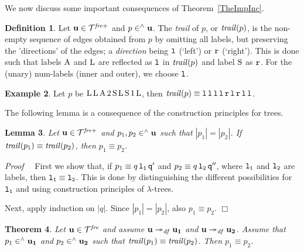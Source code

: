 \documentclass{article}
\theoremstyle{plain}
\newtheorem{The}{Theorem}[section]
\newtheorem{Lem}[The]{Lemma}
\theoremstyle{definition}
\newtheorem{Def}[The]{Definition}
\newtheorem{Exa}[The]{Example}
\begin{document}
{%



We now discuss some important consequences of Theorem~\ref{TheImpInc}.

\begin{Def}\label{DefTra}
Let ${\bf u} \in {\cal T}^{\it fre+}$ and $p \in^\wedge {\bf u}$. The {\em trail\/} of $p$, or ${\it trail\/}(p)$, is the non-empty sequence of edges obtained from $p$ by omitting all labels, but preserving the 'directions' of the edges; a {\em direction\/} being ${\tt l}$ (`left') or ${\tt r}$ (`right'). This is done such that labels ${\rm A}$ and ${\rm L}$  are reflected as ${\tt l}$ in ${\it trail\/}(p)$ and label ${\rm S}$ as ${\tt r}$. For the (unary) num-labels (inner and outer), we choose ${\tt l}$.
\end{Def}

\begin{Exa} Let $p$ be ${\rm L} \, {\rm L} \, {\rm A} \, 2 \, {\rm S} \, {\rm L} \, {\rm S} \, 1 \, {\rm L}$, then ${\it trail\/}(p) \equiv {\tt l} \, {\tt l} \, {\tt l} \, {\tt l} \, {\tt r} \, {\tt l} \, {\tt r} \, {\tt l} \, {\tt l}$.
\end{Exa}

The following lemma is a consequence of the construction principles for trees.

\begin{Lem}\label{LemTraIde}  Let ${\bf u} \in {\cal T}^{\it fre+}$ and $p_1, p_2 \in^\wedge {\bf u}$ such that $|p_1| = |p_2|$. If ${\it trail\/}(p_1) \equiv {\it trail\/}(p_2)$, then $p_1 \equiv p_2$.
\end{Lem}

{\em Proof}~~ First we show that, if $p_1 \equiv q \, \tt l_1 \, q'$ and $p_2 \equiv q \, \tt l_2 \, q''$, where $\tt l_1$ and $\tt l_2$ are labels, then $\tt l_1 \equiv \tt l_2$. This is done by distinguishing the different possibilities for $\tt l_1$ and using construction principles of $\lambda$-trees.

Next, apply induction on $|q|$. Since $|p_1| = |p_2|$, also $p_1 \equiv p_2$. $\Box$

\begin{The}\label{The}\label{TheTraTra}
Let ${\bf u} \in {\cal T}^{\it fre}$ and assume ${\bf u} \twoheadrightarrow_{\it df} {\bf u_1}$ and ${\bf u} \twoheadrightarrow_{\it df} {\bf u_2}$. Assume that $p_1 \in^\wedge {\bf u_1}$ and $p_2 \in^\wedge {\bf u_2}$ such that ${\it trail\/}(p_1) \equiv {\it trail\/}(p_2)$.
Then $p_1 \equiv p_2$.
\end{The}

}
\end{document}
